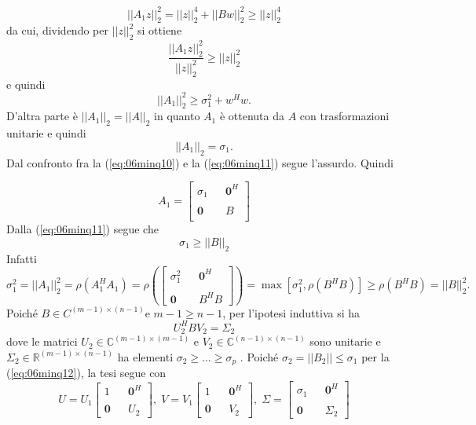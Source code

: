 \begin{thproof}
$$
||A_1 z||_2^2 = ||z||_2^4 + || Bw||_2^{2} \geq ||z||_2^4
$$
da cui, dividendo per $||z||_2^2$ si ottiene
$$
\dfrac{||A_1z||_2^2}{||z||_2^2} \geq ||z||_2^2
$$
e quindi
\begin{equation}
  \label{eq:06minq10} ||A_1||_2^{2} \geq \sigma_1^{2} + w^{H}w.
\end{equation}
D'altra parte \`e $||A_1||_2 = ||A||_2$ 
 in quanto $A_1$ \`e ottenuta da $A$ con trasformazioni unitarie e
quindi
 \begin{equation}
   \label{eq:06minq11} ||A_1||_2 =\sigma_1.
 \end{equation} Dal confronto fra la (\ref{eq:06minq10}) e la
(\ref{eq:06minq11}) segue l’assurdo. Quindi

$$
A_1 = \left[
\begin{array}{ccc} \sigma_1 & & \mathbf{0}^{H}\\ & & \\ \mathbf{0} & &
B \\
\end{array} \right]
$$
Dalla (\ref{eq:06minq11}) segue che
\begin{equation}
  \label{eq:06minq12} \sigma_1 \geq ||B||_2
\end{equation} Infatti
$$
\sigma_1^{2} = ||A_1||_2^{2} =  \rho(A_1^{H}A_1) = \rho \left( \left[
\begin{array}{ccc} \sigma_1^2 & & \mathbf{0}^{H}\\ & & \\ \mathbf{0} &
& B^{H}B
\end{array} \right] \right) = \max [\sigma_1^{2}, \rho(B^{H}B)] \geq
\rho (B^H B) = ||B||_2^2 .
$$
Poich\'e $B \in C^{(m−1)\times(n−1)} $e $m − 1 \geq n − 1$, per
l'ipotesi induttiva si ha
$$
U_2^{H}BV_2 = \Sigma_2
$$
dove le matrici $U_2 \in \mathbb{C}^{(m−1)\times(m−1)}$ e $V_2 \in
\mathbb{C}^{(n−1)\times(n−1)}$ sono unitarie e $\Sigma_2 \in
\mathbb{R}^{(m−1)\times(n−1)}$ ha elementi $\sigma_2 \geq \ldots \geq
\sigma_p$ . Poich\'e $\sigma_2 = ||B_2|| \leq \sigma_1$ per la
(\ref{eq:06minq12}), la tesi segue con
$$
U= U_1 \left[
\begin{array}{ccc} 1 & & \mathbf{0}^{H}\\ & & \\ \mathbf{0} & & U_2
\end{array} \right], \; V = V_1 \left[
\begin{array}{ccc} 1 & & \mathbf{0}^{H}\\ & & \\ \mathbf{0} & & V_2
\end{array} \right], \; \Sigma = \left[
\begin{array}{ccc} \sigma_1 & & \mathbf{0}^{H}\\ & & \\ \mathbf{0} & &
\Sigma_2
\end{array} \right]
$$


\end{thproof}
